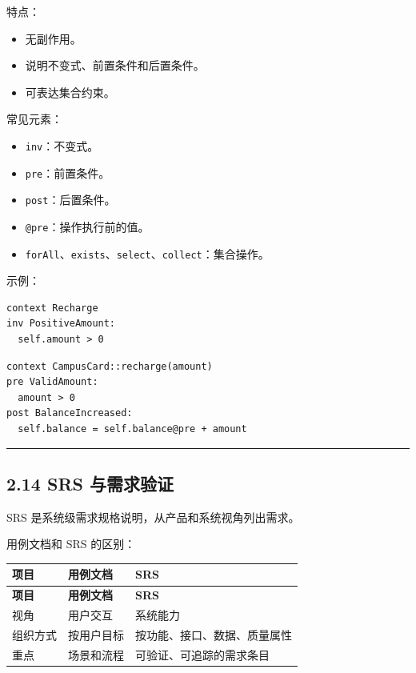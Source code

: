 \documentclass[UTF8,zihao=-4]{ctexart}
\begin{document}
特点：

\begin{itemize}
\item 无副作用。
\item 说明不变式、前置条件和后置条件。
\item 可表达集合约束。
\end{itemize}

常见元素：

\begin{itemize}
\item \texttt{inv}：不变式。
\item \texttt{pre}：前置条件。
\item \texttt{post}：后置条件。
\item \texttt{@pre}：操作执行前的值。
\item \texttt{forAll}、\texttt{exists}、\texttt{select}、\texttt{collect}：集合操作。
\end{itemize}

示例：

\small
\begin{verbatim}
context Recharge
inv PositiveAmount:
  self.amount > 0
\end{verbatim}
\normalsize

\small
\begin{verbatim}
context CampusCard::recharge(amount)
pre ValidAmount:
  amount > 0
post BalanceIncreased:
  self.balance = self.balance@pre + amount
\end{verbatim}
\normalsize

\bigskip\hrule\bigskip

\subsection{2.14 SRS 与需求验证}

SRS 是系统级需求规格说明，从产品和系统视角列出需求。

用例文档和 SRS 的区别：

\begin{longtable}{|>{\raggedright\arraybackslash}p{}|>{\raggedright\arraybackslash}p{}|>{\raggedright\arraybackslash}p{}|}
\hline
\textbf{项目} & \textbf{用例文档} & \textbf{SRS} \\
\hline
\endfirsthead
\hline
\textbf{项目} & \textbf{用例文档} & \textbf{SRS} \\
\hline
\endhead
视角 & 用户交互 & 系统能力 \\
\hline
组织方式 & 按用户目标 & 按功能、接口、数据、质量属性 \\
\hline
重点 & 场景和流程 & 可验证、可追踪的需求条目 \\
\hline
\end{longtable}
\end{document}
